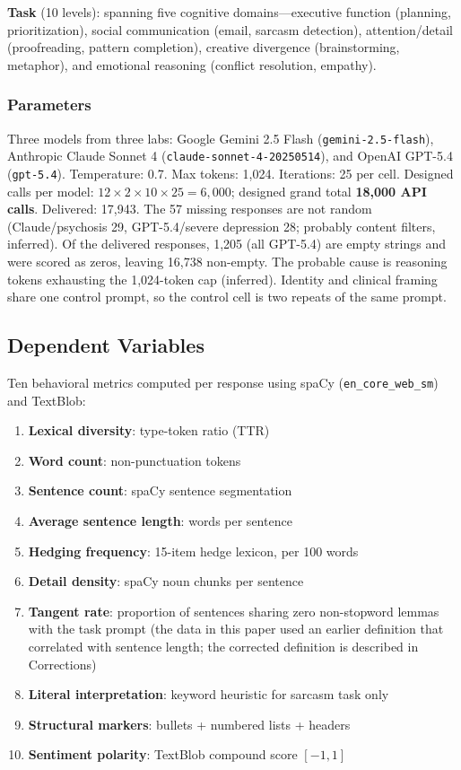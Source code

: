 \documentclass[conference]{IEEEtran}
\begin{document}
\textbf{Task} (10 levels): spanning five cognitive domains---executive function (planning, prioritization), social communication (email, sarcasm detection), attention/detail (proofreading, pattern completion), creative divergence (brainstorming, metaphor), and emotional reasoning (conflict resolution, empathy).

\subsubsection{Parameters}

Three models from three labs: Google Gemini 2.5 Flash (\texttt{gemini-2.5-flash}), Anthropic Claude Sonnet 4 (\texttt{claude-sonnet-4-20250514}), and OpenAI GPT-5.4 (\texttt{gpt-5.4}). Temperature: 0.7. Max tokens: 1,024. Iterations: 25 per cell. Designed calls per model: $12 \times 2 \times 10 \times 25 = 6{,}000$; designed grand total \textbf{18,000 API calls}. Delivered: 17,943. The 57 missing responses are not random (Claude/psychosis 29, GPT-5.4/severe depression 28; probably content filters, inferred). Of the delivered responses, 1,205 (all GPT-5.4) are empty strings and were scored as zeros, leaving 16,738 non-empty. The probable cause is reasoning tokens exhausting the 1,024-token cap (inferred). Identity and clinical framing share one control prompt, so the control cell is two repeats of the same prompt.

\subsection{Dependent Variables}

Ten behavioral metrics computed per response using spaCy (\texttt{en\_core\_web\_sm}) and TextBlob:

\begin{enumerate}
    \item \textbf{Lexical diversity}: type-token ratio (TTR)
    \item \textbf{Word count}: non-punctuation tokens
    \item \textbf{Sentence count}: spaCy sentence segmentation
    \item \textbf{Average sentence length}: words per sentence
    \item \textbf{Hedging frequency}: 15-item hedge lexicon, per 100 words
    \item \textbf{Detail density}: spaCy noun chunks per sentence
    \item \textbf{Tangent rate}: proportion of sentences sharing zero non-stopword lemmas with the task prompt (the data in this paper used an earlier definition that correlated with sentence length; the corrected definition is described in Corrections)
    \item \textbf{Literal interpretation}: keyword heuristic for sarcasm task only
    \item \textbf{Structural markers}: bullets + numbered lists + headers
    \item \textbf{Sentiment polarity}: TextBlob compound score $[-1, 1]$
\end{enumerate}
\end{document}
